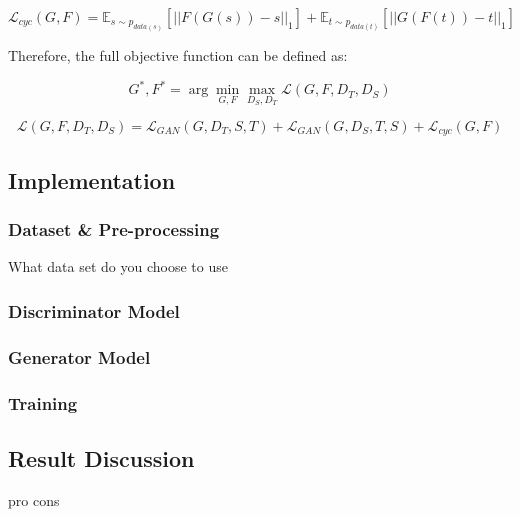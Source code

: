 \begin{equation}
    \mathcal{L}_{cyc}(G,F) = \mathbb{E}_{s \sim p_{data(s)}}[||F(G(s)) - s||_{1}] + \mathbb{E}_{t \sim p_{data(t)}}[||G(F(t)) - t||_{1}]
\end{equation}

Therefore, the full objective function can be defined as:

\begin{equation}
    G^*,F^* = \arg \mathop{\min}_{G,F} \mathop{\max}_{D_S,D_T} \mathcal{L}(G,F,D_T,D_S)
\end{equation}

\begin{equation}
    \mathcal{L}(G,F,D_T,D_S) = \mathcal{L}_{GAN}(G,D_T,S,T) + \mathcal{L}_{GAN}(G,D_S,T,S) + \mathcal{L}_{cyc}(G,F)
\end{equation}

\subsection{Implementation}

\subsubsection{Dataset \& Pre-processing}
What data set do you choose to use

\subsubsection{Discriminator Model}

\subsubsection{Generator Model}

\subsubsection{Training}

\subsection{Result Discussion}
pro cons
\newpage
